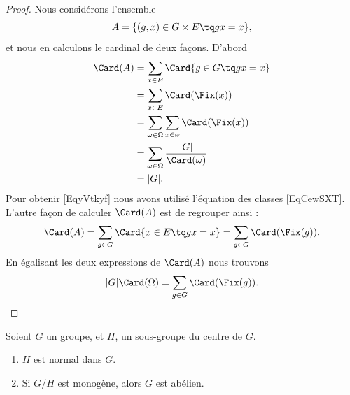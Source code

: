 \begin{proof}
	Nous considérons l'ensemble
	\begin{equation}
		A=\{ (g,x)\in G\times E\tq gx=x \},
	\end{equation}
	et nous en calculons le cardinal de deux façons. D'abord
	\begin{subequations}
		\begin{align}
			\Card(A) & =\sum_{x\in E}\Card\{ g\in G\tq gx=x \}                                      \\
			         & =\sum_{x\in E}\Card(\Fix(x))                                                 \\
			         & =\sum_{\omega\in \Omega}\sum_{x\in \omega}\Card(\Fix(x))                     \\
			         & =\sum_{\omega\in \Omega}\frac{ | G | }{ \Card(\omega) }     \label{EqyVtkyf} \\
			         & =| G |.
		\end{align}
	\end{subequations}
	Pour obtenir \eqref{EqyVtkyf} nous avons utilisé l'équation des classes \eqref{EqCewSXT}. L'autre façon de calculer \( \Card(A)\) est de regrouper ainsi :
	\begin{equation}
		\Card(A)=\sum_{g\in G}\Card\{ x\in E\tq gx=x \}=\sum_{g\in G}\Card(\Fix(g)).
	\end{equation}
	En égalisant les deux expressions de \( \Card(A)\) nous trouvons
	\begin{equation}
		| G |\Card(\Omega)=\sum_{g\in G}\Card(\Fix(g)).
	\end{equation}
\end{proof}

\begin{proposition}     \label{PROPooMYKKooLetZWi}
	Soient \( G\) un groupe, et \( H\), un sous-groupe du centre de \( G\).
	\begin{enumerate}
		\item
		      \( H\) est normal dans \( G\).
		\item
		      Si \( G/H\) est monogène, alors \( G\) est abélien.
	\end{enumerate}
\end{proposition}

